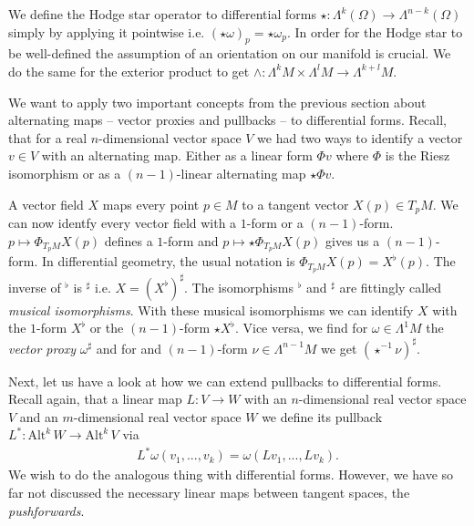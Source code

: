\documentclass[12pt,a4paper]{article}
\numberwithin{equation}{subsection}
\numberwithin{lemma}{subsection}
\theoremstyle{definition}
\newcommand{\alternating}[2]{ {\text{Alt}^{#1}\,#2} }
\begin{document}
We define the Hodge star operator to differential forms 
$\star: \Lambda^k(\Omega) \rightarrow \Lambda^{n-k}(\Omega)$ simply by applying it 
pointwise i.e. $(\star \omega)_p = \star \omega_p$. In order for 
the Hodge star to be well-defined the assumption of an orientation on our 
manifold is crucial. We do the same for the exterior product to get
$\wedge: \Lambda^k M \times \Lambda^l M \rightarrow \Lambda^{k+l} M$. 

We want to apply two important concepts from the previous section about 
alternating maps -- vector proxies and pullbacks -- to differential forms. 
Recall, that for a real $n$-dimensional vector space $V$ we had two 
ways to identify a vector $v\in V$ with an alternating map. Either as a 
linear form $\Phi v$ where $\Phi$ is the Riesz isomorphism or as a 
$(n-1)$-linear alternating map $\star \Phi v$. 

A vector field $X$ maps every point $p \in M$ to a tangent vector 
$X(p) \in T_p M$. We can now identfy every vector field with a $1$-form or 
a $(n-1)$-form. $p \mapsto \Phi_{T_p M} X(p)$ defines a $1$-form and  
$p \mapsto \star \Phi_{T_p M} X(p)$ gives us a $(n-1)$-form. In differential 
geometry, the usual notation is
$\Phi_{T_p M} X(p) = X^\flat(p)$. The inverse of $^\flat$ is $^\sharp$ i.e. 
$X = (X^\flat)^\sharp$.
The isomorphisms $^\flat$ and $^\sharp$ 
are fittingly called \textit{musical isomorphisms}. 
With these musical isomorphisms we can identify $X$ with the $1$-form 
$X^\flat$ or the $(n-1)$-form $\star X^\flat$. Vice versa, we find 
for $\omega \in \Lambda^1 M$ the \textit{vector proxy} $\omega ^\sharp$ and for 
and $(n-1)$-form $\nu \in \Lambda^{n-1} M$ we get $(\star^{-1} \nu)^\sharp$.

Next, let us have a look at how we can extend pullbacks to differential forms.
Recall again, that a linear map $L: V \rightarrow W$ with an 
$n$-dimensional real vector space $V$ and an 
$m$-dimensional real vector space $W$ we define its pullback 
$L^*: \alternating{k}{W} \rightarrow \alternating{k}{V}$ via 
\begin{align*}
    L^*\omega (v_1, ..., v_k) = \omega (Lv_1, ..., L v_k).
\end{align*} 
We wish to do the analogous thing with differential forms. However, we have 
so far not discussed the necessary linear maps between tangent spaces, 
the \textit{pushforwards}. 
\end{document}
